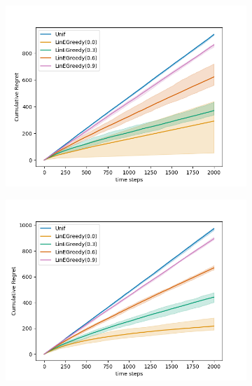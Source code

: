 \begin{figure}[H]
  \centering
  \begin{subfigure}{0.45\textwidth}
      \centering
      \includegraphics[width=\linewidth]{plots/regret_e_greedy_fixed_actions.png}
  \end{subfigure}
  \begin{subfigure}{0.45\textwidth}
      \centering
      \includegraphics[width=\linewidth]{plots/regret_e_greedy_varying_actions.png}
  \end{subfigure}


\end{figure}
